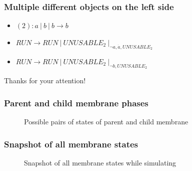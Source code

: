     \begin{frame}[t]\frametitle{Multiple different objects on the left side}
      \begin{itemize}
        \item $(2): a\ |\ b\ |\ b \rightarrow b$
        \item $RUN \rightarrow RUN\ |\ UNUSABLE_2\ |_{\neg{a,\dot{a},UNUSABLE_2}}$
        \item $RUN \rightarrow RUN\ |\ UNUSABLE_2\ |_{\neg{b,UNUSABLE_2}}$
      \end{itemize}
    \end{frame}
    \note{}

    \begin{frame}[plain]
      \begin{center}
        Thanks for your attention!
      \end{center}
    \end{frame}

    \providecommand{\narrow}[1]{\scalebox{.8}[1.0]{#1}}

    \begin{frame}[t]\frametitle{Parent and child membrane phases}
      \begin{figure}
        \def\svgwidth{\textwidth}
        
        \caption{Possible pairs of states of parent and child membrane}
        \label{fig:possible_pairs_of_states_of_parent_and_child_membrane}
      \end{figure}
    \end{frame}
    \note{}

    \begin{frame}[t]\frametitle{Snapshot of all membrane states}
      \begin{figure}
        \def\svgwidth{\textwidth}
        
        \caption{Snapshot of all membrane states while simulating}
        \label{fig:snapshot_of_all_membrane_states_while_simulating}
      \end{figure}
    \end{frame}
    \note{}




\newsavebox\mytempbib
\savebox\mytempbib{\parbox{\textwidth}{}}

